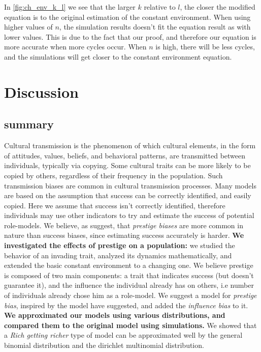 \documentclass[12pt]{extarticle}
\begin{document}
In \cref{fig:ch_env_k_l} we see that the larger $k$ relative to $l$, the closer the modified equation is to the original estimation of the constant environment. 
When using higher values of $n$, the simulation results doesn't fit the equation result as with lower values. This is due to the fact that our proof, and therefore our equation is more accurate when more cycles occur. When $n$ is high, there will be less cycles, and the simulations will get closer to the constant environment equation.

\section*{Discussion}
\subsection*{summary}
Cultural transmission is the phenomenon of which cultural elements, in the form of attitudes, values, beliefs, and behavioral patterns, are transmitted between individuals, typically via copying.
Some cultural traits can be more likely to be copied by others, regardless of their frequency in the population.  
Such transmission biases are common in cultural transmission processes. 
Many models are based on the assumption that success can be correctly identified, and easily copied.
Here we assume that success isn't correctly identified, therefore individuals may use other indicators to try and estimate the success of potential role-models.
We believe, as \citet{complexityPaper} suggest, that \textit{prestige biases} are more common in nature than success biases, since estimating success accurately is harder.
\textbf{We investigated the effects of prestige on a population:} we studied the behavior of an invading trait, analyzed its dynamics mathematically, and extended the basic constant environment to a changing one.
We believe prestige is composed of two main components: a trait that indicates success (but doesn't guarantee it), and the influence the individual already has on others, i.e number of individuals already chose him as a role-model.
We suggest a model for \textit{prestige bias}, inspired by the model \citet{evolutionBook} have suggested, and added the \textit{influence bias} to it.
\textbf{We approximated our models using various distributions, and compared them to the original model using simulations.}
We showed that a \textit{Rich getting richer} type of model can be approximated well by the general binomial distribution and the dirichlet multinomial distribution.
\end{document}
